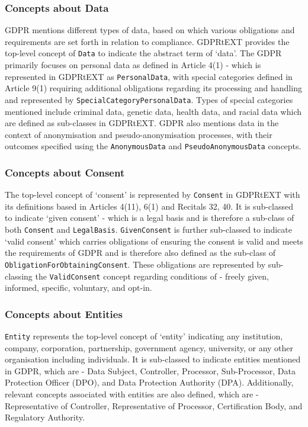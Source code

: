 \subsubsection{Concepts about Data}
GDPR mentions different types of data, based on which various obligations and requirements are set forth in relation to compliance. GDPRtEXT provides the top-level concept of \texttt{Data} to indicate the abstract term of `data'.
The GDPR primarily focuses on personal data as defined in Article 4(1) - which is represented in GDPRtEXT as \texttt{PersonalData}, with special categories defined in Article 9(1) requiring additional obligations regarding its processing and handling and represented by \texttt{SpecialCategoryPersonalData}. Types of special categories mentioned include criminal data, genetic data, health data, and racial data which are defined as sub-classes in GDPRtEXT.
GDPR also mentions data in the context of anonymisation and pseudo-anonymisation processes, with their outcomes specified using the \texttt{AnonymousData} and \texttt{PseudoAnonymousData} concepts.

\subsubsection{Concepts about Consent}
The top-level concept of `consent' is represented by \texttt{Consent} in GDPRtEXT with its definitions based in Articles 4(11), 6(1) and Recitals 32, 40. It is sub-classed to indicate `given consent' - which is a legal basis and is therefore a sub-class of both \texttt{Consent} and \texttt{LegalBasis}. \texttt{GivenConsent} is further sub-classed to indicate `valid consent' which carries obligations of ensuring the consent is valid and meets the requirements of GDPR and is therefore also defined as the sub-class of \texttt{ObligationForObtainingConsent}. These obligations are represented by sub-classing the \texttt{ValidConsent} concept regarding conditions of - freely given, informed, specific, voluntary, and opt-in.

\subsubsection{Concepts about Entities}
\texttt{Entity} represents the top-level concept of `entity' indicating any institution, company, corporation, partnership, government agency, university, or any other organisation including individuals. 
It is sub-classed to indicate entities mentioned in GDPR, which are - Data Subject, Controller, Processor, Sub-Processor, Data Protection Officer (DPO), and Data Protection Authority (DPA). Additionally, relevant concepts associated with entities are also defined, which are -  Representative of Controller, Representative of Processor, Certification Body, and Regulatory Authority.

